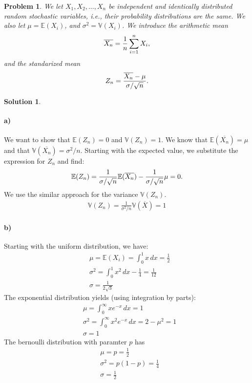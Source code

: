 \documentclass[a4paper, fleqn]{amsart}
\newtheorem{prb}{Problem}
\theoremstyle{definition}
\newtheorem{sltn}{Solution}
\begin{document}
\begin{prb}
  We let $X_1, X_2, \dots, X_n$ be independent and identically distributed
  random stochastic variables, i.e., their probability distributions are the
  same. We also let $\mu = \mathbb{E}(X_i)$, and $\sigma^2 = \mathbb{V}(X_i)$.
  We introduce the arithmetic mean
  \begin{equation}
    \notag
    \overline{X_n} = \frac{1}{n}\sum_{i=1}^{n}X_i,
  \end{equation}
  and the standarized mean
  \begin{equation}
    \notag
    Z_n = \frac{\overline{X_n}-\mu}{\sigma/\sqrt{n}}.
  \end{equation}
\end{prb}

\begin{sltn}
\item\paragraph{a)} We want to show that $\mathbb{E}(Z_n) = 0$ and $\mathbb{V}(Z_n) = 1$. We know that
  $\mathbb{E}(\overline{X_n}) = \mu$ and that $\mathbb{V}(\overline{X_n}) = \sigma^2/n$.
  Starting with the expected value, we substitute the expression for $Z_n$ and find:
  \begin{align*}
    \notag
    \mathbb{E}(Z_n) = \frac{1}{\sigma/\sqrt{n}}\mathbb{E}(\overline{X_n}) - \frac{1}{\sigma/\sqrt{n}}\mu = 0.
  \end{align*}
  We use the similar approach for the variance $\mathbb{V}(Z_n)$.
  \begin{align*}
    \mathbb{V}(Z_n) = \frac{1}{\sigma^{2}/n}\mathbb{V}(\overline{X}) = 1
  \end{align*}

\paragraph{b)}
Starting with the uniform distribution, we have:
\begin{align*}
  &\mu = \mathbb{E}(X_i) = \int_{0}^{1}x \, dx = \frac{1}{2}\\
  &\sigma^{2} = \int_{0}^{1}x^{2}\, dx - \frac{1}{4} = \frac{1}{12}\\
  &\sigma = \frac{1}{2\sqrt{3}}
\end{align*}
The exponential distribution yields (using integration by parts):
\begin{align*}
  &\mu = \int_{0}^{\infty}xe^{-x} \, dx = 1 \\
  &\sigma^2 = \int_{0}^{\infty}x^2e^{-x} \, dx = 2 - \mu^2 = 1\\
  &\sigma = 1
\end{align*} 
The bernoulli distribution with paramter $p$ has
\begin{align*}
  &\mu = p = \frac{1}{2}\\
  &\sigma^2 = p(1-p) = \frac{1}{4}\\
  &\sigma = \frac{1}{2}
\end{align*}



\end{sltn}
\end{document}
